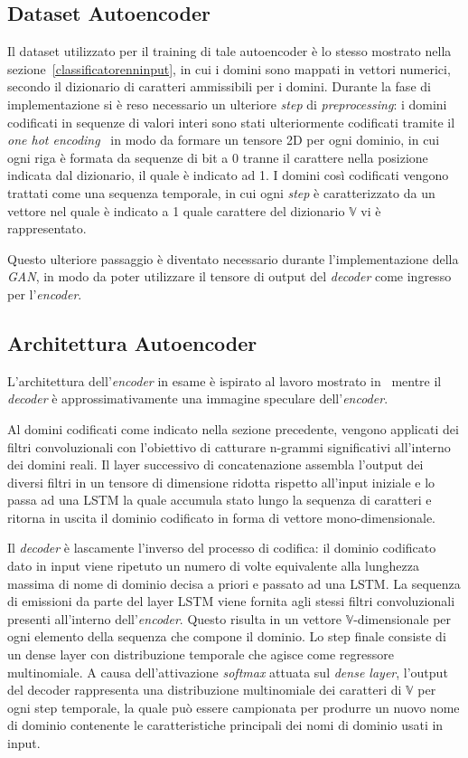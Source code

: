 \subsection{Dataset Autoencoder}
\label{datasetautoencoder}
Il dataset utilizzato per il training di tale autoencoder è lo stesso mostrato nella sezione~\ref{classificatorenninput}, in cui i domini sono mappati in vettori numerici, secondo il dizionario di caratteri ammissibili per i domini. Durante la fase di implementazione si è reso necessario un ulteriore \textit{step} di \textit{preprocessing}: i domini codificati in sequenze di valori interi sono stati ulteriormente codificati tramite il \textit{one hot encoding}~\cite{onehot} in modo da formare un tensore 2D per ogni dominio, in cui ogni riga è formata da sequenze di bit a 0 tranne il carattere nella posizione indicata dal dizionario, il quale è indicato ad 1. I domini così codificati vengono trattati come una sequenza temporale, in cui ogni \textit{step} è caratterizzato da un vettore nel quale è indicato a 1 quale carattere del dizionario $\mathbb{V}$ vi è rappresentato. 

Questo ulteriore passaggio è diventato necessario durante l'implementazione della \textit{GAN}, in modo da poter utilizzare il tensore di output del \textit{decoder} come ingresso per l'\textit{encoder}.


\subsection{Architettura Autoencoder}
\label{archautoencoder}
L'architettura dell'\textit{encoder} in esame è ispirato al lavoro mostrato in~\cite{1508.06615} mentre il \textit{decoder} è approssimativamente una immagine speculare dell'\textit{encoder}.

Al domini codificati come indicato nella sezione precedente, vengono applicati dei filtri convoluzionali con l'obiettivo di catturare n-grammi significativi all'interno dei domini reali. Il layer successivo di concatenazione assembla l'output dei diversi filtri in un tensore di dimensione ridotta rispetto all'input iniziale e lo passa ad una LSTM la quale accumula stato lungo la sequenza di caratteri e ritorna in uscita il dominio codificato in forma di vettore mono-dimensionale.

Il \textit{decoder} è lascamente l'inverso del processo di codifica: il dominio codificato dato in input viene ripetuto un numero di volte equivalente alla lunghezza massima di nome di dominio decisa a priori e passato ad una LSTM. La sequenza di emissioni da parte del layer LSTM viene fornita agli stessi filtri convoluzionali presenti all'interno dell'\textit{encoder}. Questo risulta in un vettore $\mathbb{V}$-dimensionale per ogni elemento della sequenza che compone il dominio.
Lo step finale consiste di un dense layer con distribuzione temporale che agisce come regressore multinomiale. A causa dell'attivazione \textit{softmax} attuata sul \textit{dense layer}, l'output del decoder rappresenta una distribuzione multinomiale dei caratteri di $\mathbb{V}$ per ogni step temporale, la quale può essere campionata per produrre un nuovo nome di dominio contenente le caratteristiche principali dei nomi di dominio usati in input.

